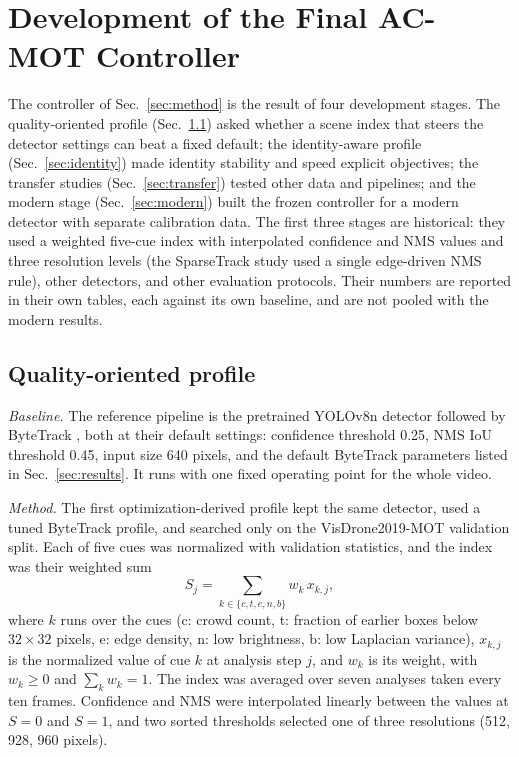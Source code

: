 \documentclass[journal]{new-aiaa}
\begin{document}
\section{Development of the Final AC-MOT Controller}\label{sec:development}

The controller of Sec.~\ref{sec:method} is the result of four development
stages. The quality-oriented profile (Sec.~\ref{sec:quality}) asked whether a
scene index that steers the detector settings can beat a fixed default; the
identity-aware profile (Sec.~\ref{sec:identity}) made identity stability and
speed explicit objectives; the transfer studies (Sec.~\ref{sec:transfer})
tested other data and pipelines; and the modern stage (Sec.~\ref{sec:modern})
built the frozen controller for a modern detector with separate calibration
data. The first three stages are historical: they used a weighted five-cue
index with interpolated confidence and NMS values and three resolution levels
(the SparseTrack study used a single edge-driven NMS rule), other detectors,
and other evaluation protocols. Their numbers are reported in their own
tables, each against its own baseline, and are not pooled with the modern
results.

\subsection{Quality-oriented profile}\label{sec:quality}

\emph{Baseline.} The reference pipeline is the pretrained YOLOv8n detector
\cite{jocher2023yolov8} followed by ByteTrack \cite{zhang2022bytetrack}, both at
their default settings: confidence threshold 0.25, NMS IoU threshold 0.45,
input size 640 pixels, and the default ByteTrack parameters listed in
Sec.~\ref{sec:results}. It runs with one fixed operating point for the whole video.

\emph{Method.} The first optimization-derived profile kept the same detector,
used a tuned ByteTrack profile, and searched only on the VisDrone2019-MOT
validation split. Each of five cues was normalized with validation
statistics, and the index was their weighted sum
\begin{equation}
S_j=\sum_{k\in\{c,t,e,n,b\}}w_k\,x_{k,j},
\label{eq:hist-sci}
\end{equation}
where $k$ runs over the cues (c: crowd count, t: fraction of earlier boxes
below $32\times32$ pixels, e: edge density, n: low brightness, b: low
Laplacian variance), $x_{k,j}$ is the normalized value of cue $k$ at analysis
step $j$, and $w_k$ is its weight, with $w_k\geq0$ and $\sum_k w_k=1$. The
index was averaged over seven analyses taken every ten frames. Confidence and NMS were interpolated linearly between the values
at $S=0$ and $S=1$, and two sorted thresholds selected one of three
resolutions (512, 928, 960 pixels).
\end{document}
